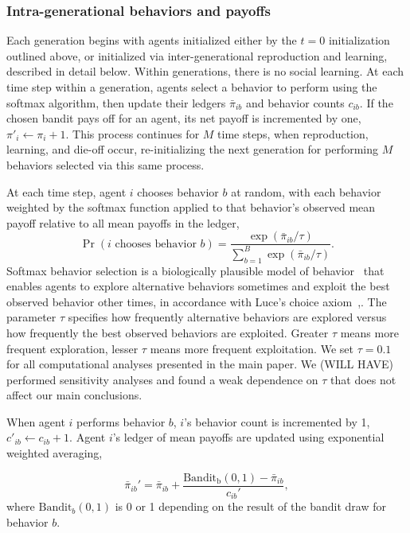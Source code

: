 \documentclass[letterpaper,11.5pt]{scrartcl}
\begin{document}
\subsubsection{Intra-generational behaviors and payoffs}

Each generation begins with agents initialized either by the $t=0$ initialization
outlined above, or initialized via inter-generational reproduction and learning,
described in detail below. Within generations, there is no social learning.
At each time step within a generation, agents select a behavior to perform
using the softmax algorithm, then update their ledgers $\bar\pi_{ib}$ and behavior
counts $c_{ib}$. If 
the chosen bandit pays off for an agent, its net payoff is incremented by one,
$\pi'_i \leftarrow \pi_i + 1$. This process continues for $M$ time steps, 
when reproduction, learning, and die-off occur, re-initializing the next 
generation for performing $M$ behaviors selected via this same process.

At each time step, 
agent $i$ chooses behavior $b$ at random, with each behavior
weighted by the softmax function applied to that behavior's observed mean payoff
relative to all mean payoffs in the ledger,
\begin{equation}
  \Pr(i \text{ chooses behavior } b) = \frac{\exp(\bar\pi_{ib}
  / \tau) }{ \sum_{b=1}^B \exp(\bar\pi_{ib} / \tau)}.
\end{equation}  
Softmax behavior selection is a
biologically plausible model of behavior~\cite{Schulz2019} 
that enables agents to explore
alternative behaviors sometimes and exploit the best observed behavior other times,
in accordance with Luce's choice axiom~\cite{Luce1959},.
The parameter $\tau$ specifies how frequently alternative behaviors are
explored versus how frequently the best observed behaviors are 
exploited. Greater $\tau$ means more frequent exploration, lesser $\tau$ means
more frequent exploitation. We set $\tau = 0.1$ for
all computational analyses presented in the main paper. We (WILL HAVE) performed
sensitivity analyses and found a weak dependence on $\tau$ that does not affect our
main conclusions.

When agent $i$ performs behavior $b$, $i$'s behavior count 
is incremented by 1, $c'_{ib} \leftarrow c_{ib} + 1$. Agent $i$'s ledger of mean 
payoffs are updated %
using exponential weighted averaging, 

\begin{equation}
  \bar\pi_{ib}' = \bar\pi_{ib} +
    \frac{\mathrm{Bandit_{b}(0, 1)} - \bar\pi_{ib}}{c_{ib}'},
\end{equation}
where 
$\mathrm{Bandit}_{b}(0, 1)$
is 0 or 1 depending on the result of the bandit draw for behavior $b$. 
\end{document}
